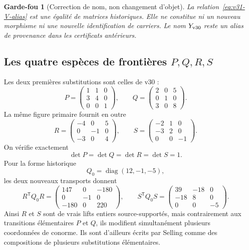 \documentclass[11pt,a4paper]{article}
\newtheorem{guardrail}[theorem]{Garde-fou}
\begin{document}
\begin{guardrail}[Correction de nom, non changement d'objet]
La relation~\eqref{eq:v31-V-alias} est une égalité de matrices historiques. Elle ne constitue ni
un nouveau morphisme ni une nouvelle identification de carriers. Le nom $Y_{\rm v30}$ reste un
alias de provenance dans les certificats antérieurs.
\end{guardrail}

\subsection{Les quatre espèces de frontières \texorpdfstring{$P,Q,R,S$}{P,Q,R,S}}

Les deux premières substitutions sont celles de v30 :
\[
 P=
 \begin{pmatrix}
 1&1&0\\3&4&0\\0&0&1
 \end{pmatrix},
 \qquad
 Q=
 \begin{pmatrix}
 2&0&5\\0&1&0\\3&0&8
 \end{pmatrix}.
\]
La même figure primaire fournit en outre
\begin{equation}\label{eq:v31-RS}
 \boxed{
 R=
 \begin{pmatrix}
 -4&0&5\\0&-1&0\\-3&0&4
 \end{pmatrix},
 \qquad
 S=
 \begin{pmatrix}
 -2&1&0\\-3&2&0\\0&0&-1
 \end{pmatrix}.}
\end{equation}
On vérifie exactement
\[
 \det P=\det Q=\det R=\det S=1.
\]
Pour la forme historique
\[
 Q_0=\operatorname{diag}(12,-1,-5),
\]
les deux nouveaux transports donnent
\begin{equation}\label{eq:v31-RS-targets}
 \boxed{
 R^{\mathsf T}Q_0R=
 \begin{pmatrix}
 147&0&-180\\
 0&-1&0\\
 -180&0&220
 \end{pmatrix},
 \qquad
 S^{\mathsf T}Q_0S=
 \begin{pmatrix}
 39&-18&0\\
 -18&8&0\\
 0&0&-5
 \end{pmatrix}.}
\end{equation}
Ainsi $R$ et $S$ sont de vrais lifts entiers source-supportés, mais contrairement aux transitions
élémentaires $P$ et $Q$, ils modifient simultanément plusieurs coordonnées de conorme. Ils sont
d'ailleurs écrits par Selling comme des compositions de plusieurs substitutions élémentaires.
\end{document}
